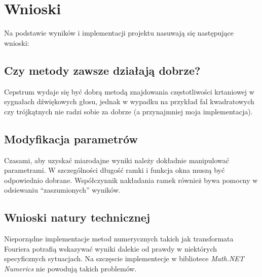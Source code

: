 \documentclass[12pt,a4paper]{article}
\begin{document}
    \clearpage

\section{Wnioski\label{sec:wnioski}}
    Na podstawie wyników i implementacji projektu nasuwają się następujące wnioski:


    \subsection{Czy metody zawsze działają dobrze?\label{sec:czydobrze}}
        Cepstrum wydaje się być dobrą metodą znajdowania częstotliwości krtaniowej w sygnałach dźwiękowych głosu, jednak w wypadku na przykład fal kwadratowych czy trójkątnych nie radzi sobie za dobrze (a przynajmniej moja implementacja).


    \subsection{Modyfikacja parametrów\label{sec:modyfikacja_parametrow}}
        Czasami, aby uzyskać miarodajne wyniki należy dokładnie manipulować parametrami. W szczególności długość ramki i funkcja okna muszą być odpowiednio dobrane. Współczynnik nakładania ramek również bywa pomocny w odsiewaniu ``zaszumionych'' wyników.


    \subsection{Wnioski natury technicznej\label{sec:problemy}}
        Nieporządne implementacje metod numerycznych takich jak transformata Fouriera potrafią wskazywać wyniki dalekie od prawdy w niektórych specyficznych sytuacjach. Na szczęscie implementecje w bibliotece \emph{Math.NET Numerics} nie powodują takich problemów.




\end{document}
